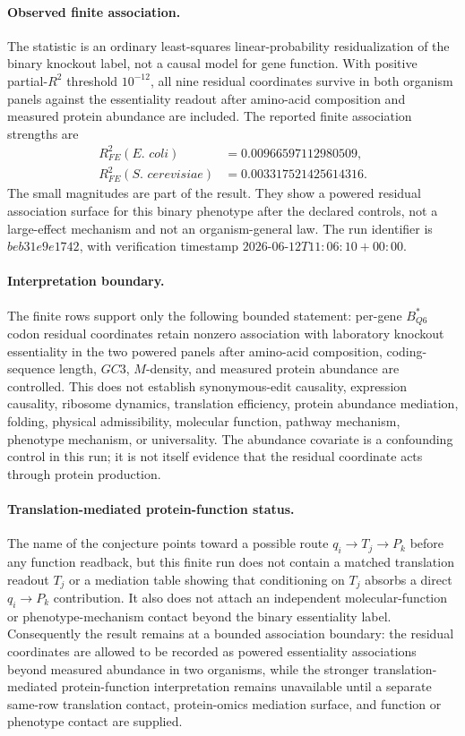 \paragraph{Observed finite association.}
The statistic is an ordinary least-squares linear-probability residualization of the binary knockout label, not a causal model for gene function. With positive partial-$R^{2}$ threshold $10^{-12}$, all nine residual coordinates survive in both organism panels against the essentiality readout after amino-acid composition and measured protein abundance are included. The reported finite association strengths are
$$
\begin{aligned}
R^{2}_{FE}(\textit{E. coli}) &= 0.00966597112980509,\\
R^{2}_{FE}(\textit{S. cerevisiae}) &= 0.003317521425614316.
\end{aligned}
$$
The small magnitudes are part of the result. They show a powered residual association surface for this binary phenotype after the declared controls, not a large-effect mechanism and not an organism-general law. The run identifier is $beb31e9e1742$, with verification timestamp $2026$-$06$-$12T11:06:10+00:00$.

\paragraph{Interpretation boundary.}
The finite rows support only the following bounded statement: per-gene $B^{*}_{Q6}$ codon residual coordinates retain nonzero association with laboratory knockout essentiality in the two powered panels after amino-acid composition, coding-sequence length, $GC3$, $M$-density, and measured protein abundance are controlled. This does not establish synonymous-edit causality, expression causality, ribosome dynamics, translation efficiency, protein abundance mediation, folding, physical admissibility, molecular function, pathway mechanism, phenotype mechanism, or universality. The abundance covariate is a confounding control in this run; it is not itself evidence that the residual coordinate acts through protein production.

\paragraph{Translation-mediated protein-function status.}
The name of the conjecture points toward a possible route $q_i \to T_j \to P_k$ before any function readback, but this finite run does not contain a matched translation readout $T_j$ or a mediation table showing that conditioning on $T_j$ absorbs a direct $q_i \to P_k$ contribution. It also does not attach an independent molecular-function or phenotype-mechanism contact beyond the binary essentiality label. Consequently the result remains at a bounded association boundary: the residual coordinates are allowed to be recorded as powered essentiality associations beyond measured abundance in two organisms, while the stronger translation-mediated protein-function interpretation remains unavailable until a separate same-row translation contact, protein-omics mediation surface, and function or phenotype contact are supplied.